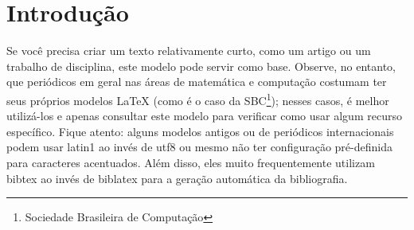 \section{Introdução}

Se você precisa criar um texto relativamente curto, como um artigo ou
um trabalho de disciplina, este modelo pode servir como base. Observe,
no entanto, que periódicos em geral nas áreas de matemática e computação
costumam ter seus próprios modelos \LaTeX{} (como é o caso da
SBC\footnote{Sociedade Brasileira de Computação}\nocite{sbctemplate});
nesses casos, é melhor utilizá-los e apenas consultar este modelo para
verificar como usar algum recurso específico. Fique atento: alguns modelos
antigos ou de periódicos internacionais podem usar \textsf{latin1} ao
invés de \textsf{utf8} ou mesmo não ter configuração pré-definida para
caracteres acentuados. Além disso, eles muito frequentemente utilizam
bibtex ao invés de biblatex para a geração automática da bibliografia.
